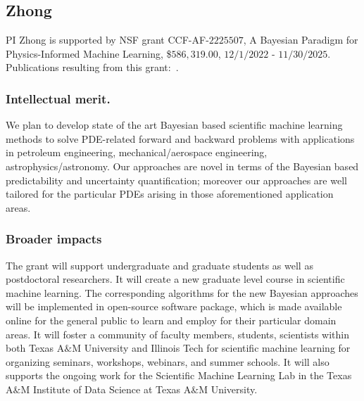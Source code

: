 \documentclass[11pt]{NSFamsart}
\begin{document}
\subsection*{Zhong} PI Zhong is supported by NSF grant CCF-AF-$2225507$, A Bayesian Paradigm for Physics-Informed Machine Learning, \$$586,319.00$, $12/1/2022$ - $11/30/2025$.  Publications resulting from this grant:~\cite{chen2022using, coutinho2022physicsinformed, ZLABN2023}.

\subsubsection*{Intellectual merit.} 
We plan to develop state of the art Bayesian based scientific machine learning methods to solve PDE-related forward and backward problems with applications in petroleum engineering, mechanical/aerospace engineering, astrophysics/astronomy.  Our approaches are novel in terms of the Bayesian based predictability and uncertainty quantification; moreover our approaches are well tailored for the particular PDEs arising in those aforementioned application areas.

\subsubsection*{Broader impacts} 
The grant will support undergraduate and graduate students as well as postdoctoral researchers.  It will create a new graduate level course in scientific machine learning. The corresponding algorithms for the new Bayesian approaches will be implemented in open-source software package, which is made available online for the general public to learn and employ for their particular domain areas.  It will foster a community of faculty members, students, scientists within both Texas A$\&$M University and Illinois Tech for scientific machine learning for organizing seminars, workshops, webinars, and summer schools.  It will also supports the ongoing work for the Scientific Machine Learning Lab in the Texas A$\&$M Institute of Data Science at Texas A$\&$M University.

 





\newpage
{}
\renewcommand{\thepage} {\arabic{page}}


% 
%

\end{document}

